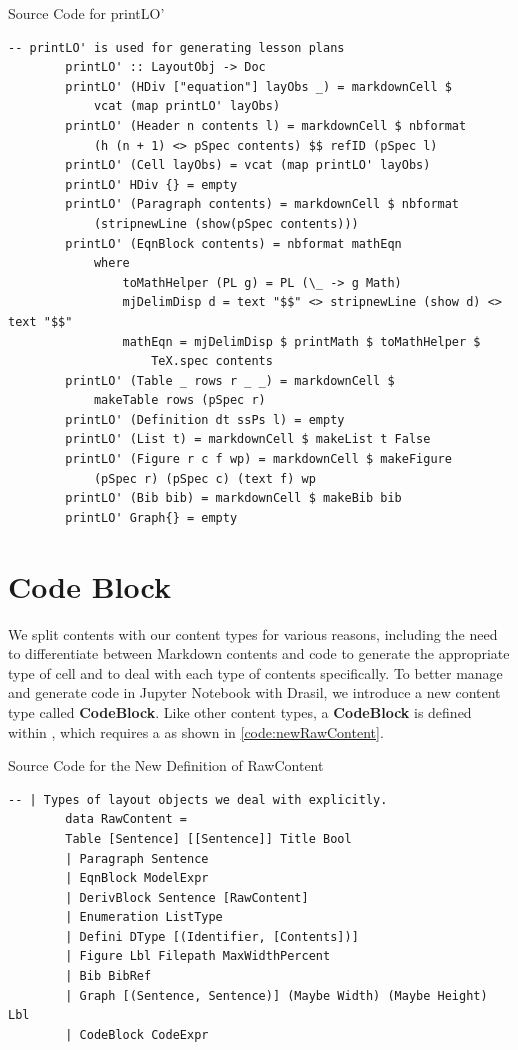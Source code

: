\begin{listing}[h!]
	\caption{Source Code for printLO'}
	\label{code:printLO'}
	\begin{lstlisting}[language=haskell1, basicstyle=\small\ttfamily]
		-- printLO' is used for generating lesson plans
		printLO' :: LayoutObj -> Doc
		printLO' (HDiv ["equation"] layObs _) = markdownCell $ 
			vcat (map printLO' layObs)
		printLO' (Header n contents l) = markdownCell $ nbformat 
			(h (n + 1) <> pSpec contents) $$ refID (pSpec l)
		printLO' (Cell layObs) = vcat (map printLO' layObs)
		printLO' HDiv {} = empty
		printLO' (Paragraph contents) = markdownCell $ nbformat 
			(stripnewLine (show(pSpec contents)))
		printLO' (EqnBlock contents) = nbformat mathEqn
			where
				toMathHelper (PL g) = PL (\_ -> g Math)
				mjDelimDisp d = text "$$" <> stripnewLine (show d) <> text "$$" 
				mathEqn = mjDelimDisp $ printMath $ toMathHelper $ 
					TeX.spec contents
		printLO' (Table _ rows r _ _) = markdownCell $ 
			makeTable rows (pSpec r)
		printLO' (Definition dt ssPs l) = empty
		printLO' (List t) = markdownCell $ makeList t False
		printLO' (Figure r c f wp) = markdownCell $ makeFigure 
			(pSpec r) (pSpec c) (text f) wp
		printLO' (Bib bib) = markdownCell $ makeBib bib
		printLO' Graph{} = empty
	\end{lstlisting}
\end{listing}

\section{Code Block}
We split contents with our content types for various reasons, including the 
need to differentiate between Markdown contents and code to generate the 
appropriate type of cell and to deal with each type of contents specifically. 
To better manage and generate code in Jupyter Notebook with Drasil, we 
introduce a new content type called \textbf{CodeBlock}. Like other content 
types, a \textbf{CodeBlock} is defined within , which 
requires a  as shown in \ref{code:newRawContent}.

\begin{listing}[h!]
	\caption{Source Code for the New Definition of RawContent}
	\label{code:newRawContent}
	\begin{lstlisting}[language=haskell1]
		-- | Types of layout objects we deal with explicitly.
		data RawContent =
		Table [Sentence] [[Sentence]] Title Bool
		| Paragraph Sentence                       
		| EqnBlock ModelExpr                      
		| DerivBlock Sentence [RawContent]        
		| Enumeration ListType                    
		| Defini DType [(Identifier, [Contents])] 
		| Figure Lbl Filepath MaxWidthPercent     
		| Bib BibRef                              
		| Graph [(Sentence, Sentence)] (Maybe Width) (Maybe Height) Lbl
		| CodeBlock CodeExpr   
	\end{lstlisting}
\end{listing}

